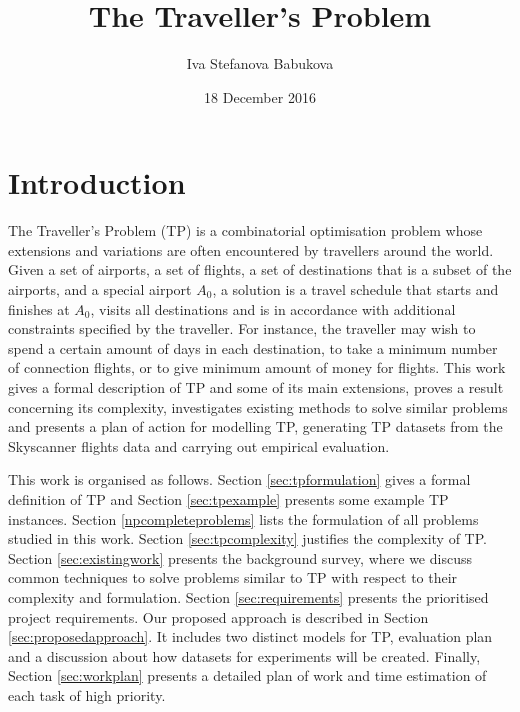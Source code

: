 \documentclass{mprop}
\theoremstyle{definition}
\begin{document}
\title{The Traveller's Problem}
\author{Iva Stefanova Babukova}
\date{18 December 2016}
\maketitle
\tableofcontents
\educationalconsent
\newpage

\section{Introduction}
\label{intro}
The Traveller’s Problem (TP) is a combinatorial optimisation problem whose extensions and variations are often encountered by travellers around the world.
Given a set of airports, a set of flights, a set of destinations that is a subset of the airports, and a special airport $A_{0}$, a solution is a travel schedule that starts and finishes at $A_{0}$, visits all destinations and is in accordance with additional constraints specified by the traveller. For instance, the traveller may wish to spend a certain amount of days in each destination, to take a minimum number of connection flights, or to give minimum amount of money for flights. This work gives a formal description of TP and some of its main extensions, proves a result concerning its complexity, investigates existing methods to solve similar problems and presents a plan of action for modelling TP, generating TP datasets from the Skyscanner flights data and carrying out empirical evaluation.

This work is organised as follows. Section \ref{sec:tpformulation} gives a formal definition of TP and Section \ref{sec:tpexample} presents some example TP instances. Section \ref{npcompleteproblems} lists the formulation of all problems studied in this work. Section \ref{sec:tpcomplexity} justifies the complexity of TP. Section \ref{sec:existingwork} presents the background survey, where we discuss common techniques to solve problems similar to TP with respect to their complexity and formulation. Section \ref{sec:requirements} presents the prioritised project requirements. Our proposed approach is described in Section \ref{sec:proposedapproach}. It includes two distinct models for TP, evaluation plan and a discussion about how datasets for experiments will be created. Finally, Section \ref{sec:workplan} presents a detailed plan of work and time estimation of each task of high priority.

\end{document}
